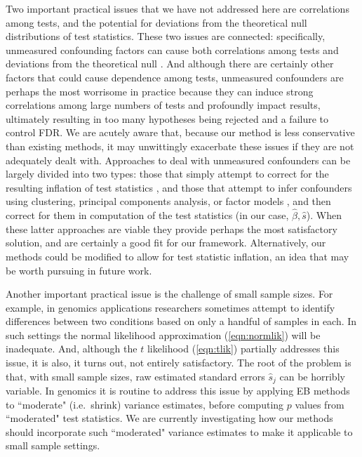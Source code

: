 \documentclass[11pt]{article}
\def\bhat{\hat{\beta}}
\def\shat{\hat{s}}
\begin{document}
Two important practical issues that we have not addressed here are correlations among tests,
and the potential for deviations from the theoretical null distributions of test statistics. These two
issues are connected: specifically, unmeasured confounding factors can cause both correlations among tests
and deviations from the theoretical null \cite{efron2007correlation,leek:2007}. And although there are certainly other
factors that could cause dependence among tests, unmeasured confounders are perhaps the most worrisome in practice
because they can induce strong correlations among large numbers of tests and profoundly impact results, ultimately resulting
in too many hypotheses being rejected and a failure to control FDR.
We are acutely aware that, because our method is less conservative than existing methods, it may unwittingly
exacerbate these issues if they are not adequately dealt with.
Approaches to deal with unmeasured confounders can be largely divided into two types: those
that simply attempt to correct for the resulting inflation of test statistics \cite{devlin1999genomic,efron2004large}, and those
that attempt to infer confounders using clustering, principal components analysis, or factor models 
\cite{pritchard.stephens.rosenberg.donnelly.00,price:2006,leek:2007,gagnon2012using},
and then correct for them in computation of the test statistics (in our case, $\bhat,\shat$). When these latter approaches are viable
they provide perhaps the most satisfactory solution, and are certainly a good fit for our framework. Alternatively, our methods
could be modified to allow for test statistic inflation, an idea that may be worth pursuing in future work.


Another important practical issue is the challenge of small sample sizes. For example, in genomics applications researchers sometimes
attempt to identify differences between two conditions based on only a handful of samples in each. In such settings the
normal likelihood approximation (\ref{eqn:normlik}) will be inadequate. And, although the $t$ likelihood (\ref{eqn:tlik}) partially
addresses this issue, it is also, it turns out, not entirely satisfactory.  The root of the problem is that, with small sample sizes, raw estimated standard
errors $\shat_j$ can be horribly variable. In genomics it is routine to address this issue by applying EB methods \cite{smyth:2004} to ``moderate" (i.e.~shrink) variance estimates,
before computing $p$ values from ``moderated" test statistics. We are currently investigating how
our methods should incorporate such ``moderated" variance estimates to make it applicable to small sample settings.
\end{document}
